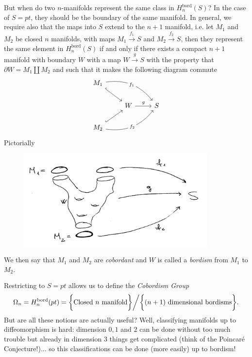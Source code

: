 But when do two $n$-manifolds represent the same class in $H^{\text{bord}}_n(S)$? In the case of $S = pt$, they should be the boundary of the same manifold. In general, we require also that the maps into $S$ extend to the $n+1$ manifold, i.e. let $M_1$ and $M_2$ be closed $n$ manifolds, with maps $M_1\xrightarrow{f_1}S$ and $M_2\xrightarrow{f_2}S$, then they represent the same element in $H^{\text{bord}}_n(S)$ if and only if there exists a compact $n+1$ manifold with boundary $W$ with a map $ W\xrightarrow{g}S$ with the property that $\partial W= M_1 \amalg M_2$ and such that it makes the following diagram commute
    $$
    \begin{tikzcd}
M_1 \arrow[rd, hook] \arrow[rrd, bend left, "f_1"' description]         \\
                                        & W \arrow[r, "g"] & S \\
M_2 \arrow[ru, hook] \arrow[rru, bend right, "f_2" description]         
\end{tikzcd}
    $$
Pictorially
\begin{figure}[!ht]
\centering
\includegraphics[width=10cm]{images/Lecture 1/cobordism.png}
\end{figure}
We then say that $M_1$ and $M_2$ are \textit{cobordant} and $W$ is called a \textit{bordism} from $M_1$ to $M_2$. 

Restricting to $S= pt$ allows us to define the \textit{Cobordism Group}
$$\Omega_n=
H^{\text{bord}}_n(pt)=
\bigg\{\text{Closed $n$ manifold}\bigg\}
\bigg{/}
\biggl\{(n+1)\text{ dimensional bordisms}
\biggl\}.$$
But are all these notions are actually useful? Well, classifying manifolds up to diffeomorphism is hard: dimension $0, 1$ and $2$ can be done without too much trouble but already in dimension $3$ things get complicated (think of the Poincaré Conjecture!)... so this classifications can be done (more easily) up to bordism!

